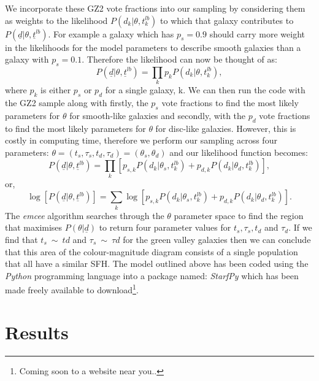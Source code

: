 \documentclass{mn2e}
\begin{document}
We incorporate these GZ2 vote fractions  into our sampling by considering them as weights to the likelihood $P(d_{k}|\theta, t^{lb}_{k})$ to which that galaxy contributes to $P(\underline{d}|\theta, \underline{t}^{lb})$. For example a galaxy which has $p_{s} = 0.9$ should carry more weight in the likelihoods for the model parameters to describe smooth galaxies than a galaxy with $p_{s} = 0.1$. Therefore the likelihood can now be thought of as:
\begin{equation*}
P(\underline{d}|\theta, \underline{t}^{lb}) = \prod_{k} p_{k} P(d_{k}|\theta, t_{k}^{lb}),
\end{equation*}
where $p_{k}$ is either $p_{s}$ or $p_{d}$ for a single galaxy, k. We can then run the code with the GZ2 sample along with firstly, the $p_{s}$ vote fractions to find the most likely parameters for $\theta$ for smooth-like galaxies and secondly, with the $p_{d}$ vote fractions to find the most likely parameters for $\theta$ for disc-like galaxies. However, this is costly in computing time, therefore we perform our sampling across four parameters: $\theta = (t_{s}, \tau_{s}, t_{d}, \tau_{d}) = (\theta_{s}, \theta_{d})$ and our likelihood function becomes:
\begin{equation*}
P(\underline{d}|\theta, \underline{t}^{lb}) = \prod_{k} \left [p_{s, k} P(d_{k}|\theta_{s}, t_{k}^{lb}) + p_{d, k} P(d_{k}|\theta_{d}, t_{k}^{lb}) \right],
\end{equation*}
or,
\begin{equation*}
\log \left[ P(\underline{d}|\theta, \underline{t}^{lb}) \right] = \sum_{k} \log \left [p_{s, k} P(d_{k}|\theta_{s}, t_{k}^{lb}) + p_{d, k} P(d_{k}|\theta_{d}, t_{k}^{lb}) \right]. 
\end{equation*}
The \emph{emcee} algorithm searches through the $\theta$ parameter space to find the region that maximises $P(\theta|\underline{d})$ to return four parameter values for $t_{s}, \tau_{s}, t_{d}$ and $\tau_{d}$. If we find that $t_{s}~\sim~t{d}$ and $\tau_{s} ~\sim~ \tau{d}$ for the green valley galaxies then we can conclude that this area of the colour-magnitude diagram consists of a single population that all have a similar SFH. The model outlined above has been coded using the \emph{Python} programming language into a package named: \emph{StarfPy} which has been made freely available to download\footnote{Coming soon to a website near you..}.


\section{Results}\label{results}
\end{document}
